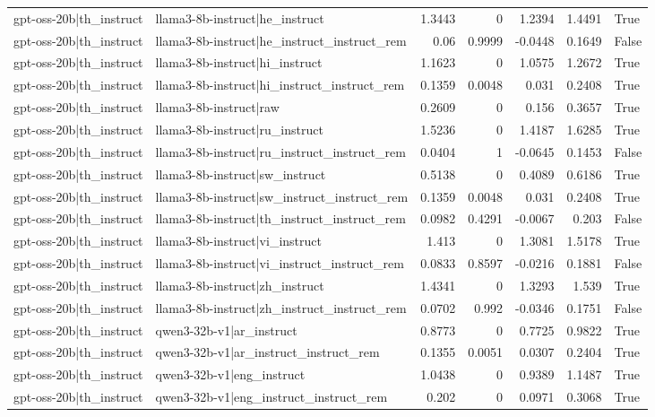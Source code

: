 \begin{table}
\begin{tabular}{l l r r r r l}
gpt-oss-20b|th_instruct & llama3-8b-instruct|he_instruct & 1.3443 & 0 & 1.2394 & 1.4491 & True \\
gpt-oss-20b|th_instruct & llama3-8b-instruct|he_instruct_instruct_rem & 0.06 & 0.9999 & -0.0448 & 0.1649 & False \\
gpt-oss-20b|th_instruct & llama3-8b-instruct|hi_instruct & 1.1623 & 0 & 1.0575 & 1.2672 & True \\
gpt-oss-20b|th_instruct & llama3-8b-instruct|hi_instruct_instruct_rem & 0.1359 & 0.0048 & 0.031 & 0.2408 & True \\
gpt-oss-20b|th_instruct & llama3-8b-instruct|raw & 0.2609 & 0 & 0.156 & 0.3657 & True \\
gpt-oss-20b|th_instruct & llama3-8b-instruct|ru_instruct & 1.5236 & 0 & 1.4187 & 1.6285 & True \\
gpt-oss-20b|th_instruct & llama3-8b-instruct|ru_instruct_instruct_rem & 0.0404 & 1 & -0.0645 & 0.1453 & False \\
gpt-oss-20b|th_instruct & llama3-8b-instruct|sw_instruct & 0.5138 & 0 & 0.4089 & 0.6186 & True \\
gpt-oss-20b|th_instruct & llama3-8b-instruct|sw_instruct_instruct_rem & 0.1359 & 0.0048 & 0.031 & 0.2408 & True \\
gpt-oss-20b|th_instruct & llama3-8b-instruct|th_instruct_instruct_rem & 0.0982 & 0.4291 & -0.0067 & 0.203 & False \\
gpt-oss-20b|th_instruct & llama3-8b-instruct|vi_instruct & 1.413 & 0 & 1.3081 & 1.5178 & True \\
gpt-oss-20b|th_instruct & llama3-8b-instruct|vi_instruct_instruct_rem & 0.0833 & 0.8597 & -0.0216 & 0.1881 & False \\
gpt-oss-20b|th_instruct & llama3-8b-instruct|zh_instruct & 1.4341 & 0 & 1.3293 & 1.539 & True \\
gpt-oss-20b|th_instruct & llama3-8b-instruct|zh_instruct_instruct_rem & 0.0702 & 0.992 & -0.0346 & 0.1751 & False \\
gpt-oss-20b|th_instruct & qwen3-32b-v1|ar_instruct & 0.8773 & 0 & 0.7725 & 0.9822 & True \\
gpt-oss-20b|th_instruct & qwen3-32b-v1|ar_instruct_instruct_rem & 0.1355 & 0.0051 & 0.0307 & 0.2404 & True \\
gpt-oss-20b|th_instruct & qwen3-32b-v1|eng_instruct & 1.0438 & 0 & 0.9389 & 1.1487 & True \\
gpt-oss-20b|th_instruct & qwen3-32b-v1|eng_instruct_instruct_rem & 0.202 & 0 & 0.0971 & 0.3068 & True \\

\end{tabular}
\end{table}
